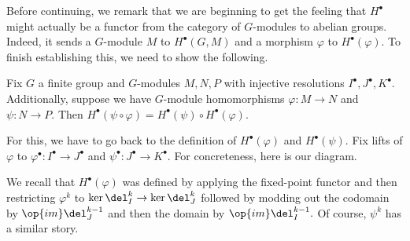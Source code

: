 Before continuing, we remark that we are beginning to get the feeling that $H^\bullet$ might actually be a functor from the category of $G$-modules to abelian groups. Indeed, it sends a $G$-module $M$ to $H^\bullet(G,M)$ and a morphism $\varphi$ to $H^\bullet(\varphi).$ To finish establishing this, we need to show the following.
\begin{lemma}
    Fix $G$ a finite group and $G$-modules $M,N,P$ with injective resolutions $I^\bullet,J^\bullet,K^\bullet.$ Additionally, suppose we have $G$-module homomorphisms $\varphi:M\to N$ and $\psi:N\to P.$ Then $H^\bullet(\psi\circ\varphi)=H^\bullet(\psi)\circ H^\bullet(\varphi).$
\end{lemma}
For this, we have to go back to the definition of $H^\bullet(\varphi)$ and $H^\bullet(\psi).$ Fix lifts of $\varphi$ to $\varphi^\bullet:I^\bullet\to J^\bullet$ and $\psi^\bullet:J^\bullet\to K^\bullet.$ For concreteness, here is our diagram.
\begin{center}
\end{center}
We recall that $H^\bullet(\varphi)$ was defined by applying the fixed-point functor and then restricting $\varphi^k$ to $\ker\del_I^k\to\ker\del_J^k$ followed by modding out the codomain by $\op{im}\del_J^{k-1}$ and then the domain by $\op{im}\del_I^{k-1}.$ Of course, $\psi^k$ has a similar story.


